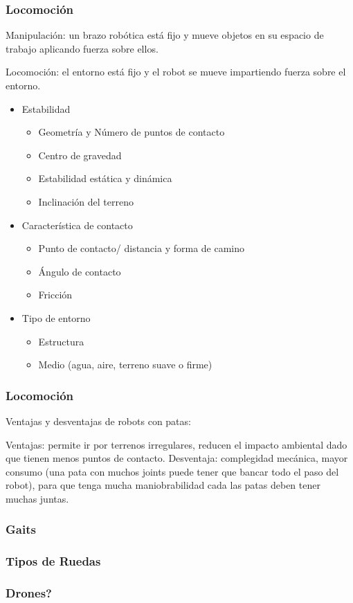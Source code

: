\begin{frame}
    \frametitle{Locomoción}

    Manipulación: un brazo robótica está fijo y mueve objetos en su espacio de trabajo aplicando fuerza sobre ellos.

    Locomoción: el entorno está fijo y el robot se mueve impartiendo fuerza sobre el entorno.
    \begin{itemize}
        \item Estabilidad
        \begin{itemize}
            \item Geometría y Número de puntos de contacto
            \item Centro de gravedad
            \item Estabilidad estática y dinámica
            \item Inclinación del terreno
        \end{itemize}
        \item Característica de contacto
        \begin{itemize}
            \item Punto de contacto/ distancia y forma de camino
            \item Ángulo de contacto
            \item Fricción
        \end{itemize}
        \item Tipo de entorno
        \begin{itemize}
            \item Estructura
            \item Medio (agua, aire, terreno suave o firme)
        \end{itemize}
    \end{itemize}
\end{frame}

\begin{frame}
    \frametitle{Locomoción}
    Ventajas y desventajas de robots con patas:

    Ventajas: permite ir por terrenos irregulares, reducen el impacto ambiental dado que tienen menos puntos de contacto.
    Desventaja: complegidad mecánica, mayor consumo (una pata con muchos joints puede tener que bancar todo el paso del robot), para que tenga mucha maniobrabilidad cada las patas deben tener muchas juntas.

\end{frame}


\begin{frame}
    \frametitle{Gaits}

\end{frame}


\begin{frame}
    \frametitle{Tipos de Ruedas}

\end{frame}

\begin{frame}
    \frametitle{Drones?}

\end{frame}